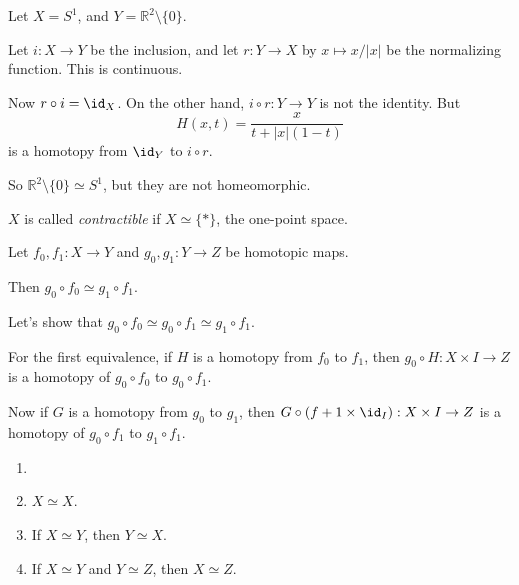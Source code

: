 \documentclass[12pt]{article}
\begin{document}
\begin{exbox}
	Let $X = S^1$, and $Y = \mathbb{R}^2 \setminus \{0\}$.

	Let $i : X \to Y$ be the inclusion, and let $r : Y \to X$ by $x \mapsto x/|x|$ be the normalizing function. This is continuous.

	Now $r \circ i = \id_X$. On the other hand, $i \circ r : Y \to Y$ is not the identity. But
	\[
	H(x, t) = \frac{x}{t + |x|(1-t)}
	\]
	is a homotopy from $\id_Y$ to $i \circ r$.

	So $\mathbb{R}^2 \setminus \{0\} \simeq S^1$, but they are not homeomorphic.
\end{exbox}

\begin{definition}
	$X$ is called \emph{contractible} if $X \simeq \{\ast\}$, the one-point space.
\end{definition}

\begin{lemma}
	Let $f_0, f_1 : X \to Y$ and $g_0, g_1 : Y \to Z$ be homotopic maps.

	Then $g_0 \circ f_0 \simeq g_1 \circ f_1$.
\end{lemma}

\begin{proofbox}
	Let's show that $g_0 \circ f_0 \simeq g_0 \circ f_1 \simeq g_1 \circ f_1$.

	For the first equivalence, if $H$ is a homotopy from $f_0$ to $f_1$, then $g_0 \circ H : X \times I \to Z$ is a homotopy of $g_0 \circ f_0$ to $g_0 \circ f_1$.

	Now if $G$ is a homotopy from $g_0$ to $g_1$, then $G \circ (f+1 \times \id_I) : X \times I \to Z$ is a homotopy of $g_0 \circ f_1$ to $g_1 \circ f_1$.
\end{proofbox}


\begin{proposition}
	\begin{enumerate}[\normalfont(i)]
		\item[]
		\item $X \simeq X$.
		\item If $X \simeq Y$, then $Y \simeq X$.
		\item If $X \simeq Y$ and $Y \simeq Z$, then $X \simeq Z$.
	\end{enumerate}	
\end{proposition}
\end{document}

